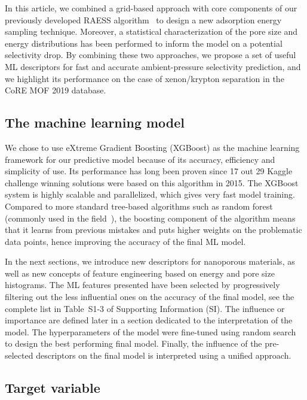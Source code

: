 \documentclass[main]{subfiles}
\begin{document}
In this article, we combined a grid-based approach with core components of our previously developed RAESS algorithm~\cite{Ren_2023} to design a new adsorption energy sampling technique. Moreover, a statistical characterization of the pore size and energy distributions has been performed to inform the model on a potential selectivity drop. By combining these two approaches, we propose a set of useful ML descriptors for fast and accurate ambient-pressure selectivity prediction, and we highlight its performance on the case of xenon/krypton separation in the CoRE MOF 2019 database\cite{Chung_2019}.

\subsection{The machine learning model}

We chose to use eXtreme Gradient Boosting (XGBoost) as the machine learning framework for our predictive model because of its accuracy, efficiency and simplicity of use. Its performance has long been proven since 17 out 29 Kaggle challenge winning solutions were based on this algorithm in 2015. The XGBoost system is highly scalable and parallelized, which gives very fast model training.\cite{chen2016xgboost} Compared to more standard tree-based algorithms such as random forest (commonly used in the field~\cite{Simon_2015}), the boosting component of the algorithm means that it learns from previous mistakes and puts higher weights on the problematic data points, hence improving the accuracy of the final ML model.

In the next sections, we introduce new descriptors for nanoporous materials, as well as new concepts of feature engineering based on energy and pore size histograms. The ML features presented have been selected by progressively filtering out the less influential ones on the accuracy of the final model, see the complete list in Table~S1-3 of Supporting Information (SI). The influence or importance are defined later in a section dedicated to the interpretation of the model. The hyperparameters of the model were fine-tuned using random search to design the best performing final model. Finally, the influence of the pre-selected descriptors on the final model is interpreted using a unified approach.

\subsection{Target variable}
\end{document}
